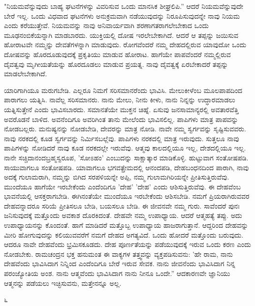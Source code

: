 "ನಿಯಮವೆನ್ನುವುದು ಬಾಹ್ಯ ಘಟನೆಗಳನ್ನು ವಿವರಿಸುವ ಒಂದು ಮಾನಸಿಕ ಶೀಘ್ರಲಿಪಿ.” ಆದರೆ ನಿಯಮವೆನ್ನುವುದೇ ಬೇರೆ ಇಲ್ಲ. ಒಂದು ವಿಧವಾದ ಘಟನೆಗಳು ಅನುಕ್ರಮವಾಗಿ ನಡೆಯುವುದನ್ನು ನಿರೂಪಿಸುವುದನ್ನೇ ನಾವು ನಿಯಮ ಎಂದು ಕರೆಯುತ್ತೇವೆ. ನಿಯಮವನ್ನು ನಾವು ಅನಿವಾರ್ಯವಾಗಿ ಶರಣಾಗತರಾಗಲೇಬೇಕಾದ ಒಂದು ಮೂಢನಂಬಿಕೆಯನ್ನಾಗಿ ಮಾಡಬಾರದು. ಯುಕ್ತಿಯಲ್ಲಿ ದೋಷ ಇರಲೇಬೇಕಾಗಿದೆ. ಆದರೆ ಆ ತಪ್ಪನ್ನು ಜಯಿಸುವ ಹೋರಾಟವೇ ನಮ್ಮನ್ನು ದೇವತೆಗಳನ್ನಾಗಿ ಮಾಡುವುದು. ರೋಗವೆಂದರೆ ನಮ್ಮ ದೇಹದಲ್ಲಿರುವ ಯಾವುದೋ ಒಂದು ದೋಷವನ್ನು ಹೊರದೂಡುವುದಕ್ಕೆ ಪ್ರಕೃತಿಯು ಮಾಡುವ ಹೋರಾಟ. ಹಾಗೆಯೇ ಪಾಪವೆಂದರೆ ನಮ್ಮಲ್ಲಿರುವ ದೈವತ್ವವು ಮೃಗೀಯತೆಯನ್ನು ಹೊರದೂಡಲು ಮಾಡುವ ಪ್ರಯತ್ನ. ನಾವು ದೈವತ್ವಕ್ಕೆ ಏರಬೇಕಾದರೆ ತಪ್ಪನ್ನು ಮಾಡಲೇಬೇಕಾಗಿದೆ.

ಯಾರಿಗಾಗಿಯೂ ಮರುಗಬೇಡಿ. ಎಲ್ಲರೂ ನಿಮಗೆ ಸರಿಸಮಾನರೆಂದು ಭಾವಿಸಿ. ಮೇಲುಕೀಳೆಂಬ ಮೂಲಪಾಪದಿಂದ ಪಾರಾಗಲು ಯತ್ನಿಸಿ. ನಾವೆಲ್ಲ ಸರಿಸಮಾನರು. ನಾನು ಮೇಲು, ನೀನು ಕೀಳು, ನಾನು ನಿನ್ನನ್ನು ಉದ್ಧಾರಮಾಡಲು ಯತ್ನಿಸುತ್ತೇನೆ ಎಂದು ಭಾವಿಸಬಾರದು. ಸಮಾನತೆಯೇ ಮುಕ್ತನ ಚಿಹ್ನೆ. ಏಸುವು ಜನಸಾಮಾನ್ಯರಲ್ಲಿ ಅವತಾರವೆತ್ತಿ ಅವರೊಡನೆ ಬಾಳಿದ. ಅವನೆಂದಿಗೂ ಅವರಿಗಿಂತ ತಾನು ಮೇಲೆಂದು ಭಾವಿಸಲಿಲ್ಲ. ಪಾಪಿಗಳು ಮಾತ್ರ ಪಾಪವನ್ನು ನೋಡಬಲ್ಲರು. ಮನುಷ್ಯನನ್ನು ನೋಡಬೇಡಿ, ದೇವರನ್ನು ಮಾತ್ರ ನೋಡಿ. ನಾವೇ ನಮ್ಮ ಸ್ವರ್ಗವನ್ನು ಸೃಷ್ಟಿಸುವವರು. ನಾವು ನರಕದಲ್ಲಿ ಕೂಡ ಸ್ವರ್ಗವನ್ನು ನಿರ್ಮಿಸಬಲ್ಲೆವು. ಪಾಪಿಗಳು ನರಕದಲ್ಲಿ ಮಾತ್ರ ಇರುವುದು. ಸುತ್ತಲೂ ನಾವು ಪಾಪಿಗಳನ್ನು ನೋಡಿದರೆ ನಾವು ಕೂಡ ನರಕದಲ್ಲೇ ಇರುವೆವು. ಆತ್ಮವು ಕಾಲದಲ್ಲಿಯೂ ಇಲ್ಲ, ದೇಶದಲ್ಲಿಯೂ ಇಲ್ಲ. ನಾನೇ ಸಚ್ಚಿದಾನಂದಬ್ರಹ್ಮಸ್ವರೂಪ, 'ಸೋಽಹಂ' ಎಂಬುದನ್ನು ಸಾಕ್ಷಾತ್ಕಾರ ಮಾಡಿಕೊಳ್ಳಿ. ಹುಟ್ಟುವಾಗ ಸಂತೋಷಪಡಿ. ಸಾಯುವಾಗಲೂ ಸಂತೋಷಪಡಿ. ಯಾವಾಗಲೂ ಭಗವತ್ಪ್ರೇಮದಲ್ಲಿ ಆನಂದಪಡಿ, ದೇಹಬಂಧನದಿಂದ ಪಾರಾಗಿ, ನಾವು ಅದಕ್ಕೆ ಗುಲಾಮರಾಗಿ, ನಮ್ಮನ್ನು ಬಿಗಿದ ಸರಪಳಿಯನ್ನೇ ಅಪ್ಪಿ, ನಮ್ಮ ಗುಲಾಮಗಿರಿಯನ್ನೇ ಪ್ರೀತಿಸುತ್ತಿರುವೆವು. ಮುಂದೆಯೂ ಹಾಗೆಯೇ ಇರಬೇಕೆಂದು ಎಂದೆಂದಿಗೂ 'ದೇಹ' 'ದೇಹ' ಎಂದು ಆಶಿಸುತ್ತಿರುವೆವು. ಈ ದೇಹವೆಂಬ ಭಾವನೆಯಲ್ಲಿ ಆಸಕ್ತರಾಗಬೇಡಿ. ಈಗಿನಂತೆಯೇ ಮುಂದೆಯೂ ಇರಬೇಕೆಂದು ಆಶಿಸಬೇಡಿ. ನಮಗೆ ಪ್ರಿಯರಾಗಿರುವವರ ದೇಹವನ್ನಾದರೂ ಸರಿಯೆ ಪ್ರೀತಿಸಲೂ ಬೇಡಿ, ಬಯಸಲೂ ಬೇಡಿ. ಈ ಜೀವನವೇ ನಮ್ಮ ಗುರು. ಸಾವೆಂದರೆ ಪುನಃ ಜನಿಸುವುದಕ್ಕೆ ಮತ್ತೊಂದು ಅವಕಾಶ ದೊರಕಿದಂತೆ. ದೇಹವೇ ನಮ್ಮ ಉಪಾಧ್ಯಾಯ. ಆದರೆ ಆತ್ಮಹತ್ಯೆ ತಪ್ಪು. ಅದು ಉಪಾಧ್ಯಾಯನನ್ನು ಕೊಂದಂತೆ. ಹಾಗೆ ಮಾಡಿದರೆ ಮತ್ತೊಬ್ಬ ಉಪಾಧ್ಯಾಯ ಹಾಜರಾಗುತ್ತಾನೆ. ಆದ್ದರಿಂದ ದೇಹವನ್ನು ಮೀರಿ ಹೋಗುವುದನ್ನು ಕಲಿಯುವವರೆಗೆ ನಮಗೆ ದೇಹದ ಅಗತ್ಯವಿದೆ. ಒಂದು ಹೋದರೆ ಮತ್ತೊಂದು ಬರುವುದು. ಆದರೂ ನಾವೇ ದೇಹವೆಂದು ಭ್ರಮಿಸಕೂಡದು. ದೇಹ ಪೂರ್ಣತೆಯನ್ನು ಪಡೆಯುವುದಕ್ಕೆ ಇರುವ ಒಂದು ಕರಣ ಎಂದು ನೋಡಬೇಕು. ರಾಮಚಂದ್ರನ ಭಕ್ತ ಹನುಮಂತ ಈ ವಾಕ್ಯಗಳ ತತ್ತ್ವವನ್ನು ವ್ಯಕ್ತಪಡಿಸುವನು: 'ಹೇ ರಾಮ, ನಾನು ದೇಹವೆಂದು ಭಾವಿಸಿದಾಗ ನಿನ್ನಿಂದ ಎಂದೆಂದಿಗೂ ಬೇರೆ ಇರುವ ಸೇವಕ. ನಾನು ಜೀವನೆಂದು ಭಾವಿಸಿದಾಗ ನಿನ್ನ ಪರಂಜ್ಯೋತಿಯ ಅಂಶ. ನಾನು ಆತ್ಮವೆಂದು ಭಾವಿಸಿದಾಗ ನಾನು ನೀನೂ ಒಂದೇ.'' ಆದಕಾರಣವೇ ಜ್ಞಾನಿಯು ಆತ್ಮನನ್ನು ಪಡೆಯಲು ಇಚ್ಛಿಸುವನು, ಮತ್ತೇನನ್ನೂ ಅಲ್ಲ.

\begin{center}
೬
\end{center}

